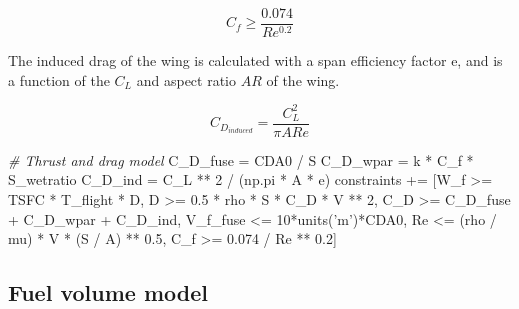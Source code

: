 \documentclass[]{article}
\newenvironment{Shaded}{}{}
\newcommand{\DecValTok}[1]{\textcolor[rgb]{0.25,0.63,0.44}{#1}}
\newcommand{\FloatTok}[1]{\textcolor[rgb]{0.25,0.63,0.44}{#1}}
\newcommand{\StringTok}[1]{\textcolor[rgb]{0.25,0.44,0.63}{#1}}
\newcommand{\CommentTok}[1]{\textcolor[rgb]{0.38,0.63,0.69}{\textit{#1}}}
\newcommand{\OperatorTok}[1]{\textcolor[rgb]{0.40,0.40,0.40}{#1}}
\newcommand{\NormalTok}[1]{#1}
\begin{document}
\begin{equation}
    C_f \geq \frac{0.074} {Re^{0.2}}
\end{equation}

The induced drag of the wing is calculated with a span efficiency factor
e, and is a function of the \(C_L\) and aspect ratio \(AR\) of the wing.

\begin{equation}
    C_{D_{induced}} = \frac{C_L^2}{\pi AR e}
\label{e:cdinduced}
\end{equation}

\begin{Shaded}
\begin{Highlighting}[]
        \CommentTok{# Thrust and drag model}
\NormalTok{        C_D_fuse }\OperatorTok{=}\NormalTok{ CDA0 }\OperatorTok{/}\NormalTok{ S}
\NormalTok{        C_D_wpar }\OperatorTok{=}\NormalTok{ k }\OperatorTok{*}\NormalTok{ C_f }\OperatorTok{*}\NormalTok{ S_wetratio}
\NormalTok{        C_D_ind  }\OperatorTok{=}\NormalTok{ C_L }\OperatorTok{**} \DecValTok{2} \OperatorTok{/}\NormalTok{ (np.pi }\OperatorTok{*}\NormalTok{ A }\OperatorTok{*}\NormalTok{ e)}
\NormalTok{        constraints }\OperatorTok{+=}\NormalTok{ [W_f }\OperatorTok{>=}\NormalTok{ TSFC }\OperatorTok{*}\NormalTok{ T_flight }\OperatorTok{*}\NormalTok{ D,}
\NormalTok{                    D }\OperatorTok{>=} \FloatTok{0.5} \OperatorTok{*}\NormalTok{ rho }\OperatorTok{*}\NormalTok{ S }\OperatorTok{*}\NormalTok{ C_D }\OperatorTok{*}\NormalTok{ V }\OperatorTok{**} \DecValTok{2}\NormalTok{,}
\NormalTok{                    C_D }\OperatorTok{>=}\NormalTok{ C_D_fuse }\OperatorTok{+}\NormalTok{ C_D_wpar }\OperatorTok{+}\NormalTok{ C_D_ind,}
\NormalTok{                    V_f_fuse }\OperatorTok{<=} \DecValTok{10}\OperatorTok{*}\NormalTok{units(}\StringTok{'m'}\NormalTok{)}\OperatorTok{*}\NormalTok{CDA0,}
\NormalTok{                    Re }\OperatorTok{<=}\NormalTok{ (rho }\OperatorTok{/}\NormalTok{ mu) }\OperatorTok{*}\NormalTok{ V }\OperatorTok{*}\NormalTok{ (S }\OperatorTok{/}\NormalTok{ A) }\OperatorTok{**} \FloatTok{0.5}\NormalTok{,}
\NormalTok{                    C_f }\OperatorTok{>=} \FloatTok{0.074} \OperatorTok{/}\NormalTok{ Re }\OperatorTok{**} \FloatTok{0.2}\NormalTok{]}
\end{Highlighting}
\end{Shaded}

\subsection{Fuel volume model}\label{fuel-volume-model}
\end{document}
